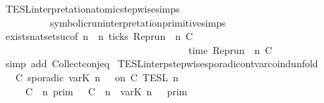 \begin{isabellebody}
\isanewline
%
\isadelimproof
%
\endisadelimproof
%
\isatagproof
{}\isamarkupfalse%
\ TESL{\isacharunderscore}interpretation{\isacharunderscore}atomic{\isacharunderscore}stepwise{\isachardot}simps{\isacharparenleft}{}{\isacharparenright}\isanewline
\ \ \ \ \ \ \ \ \ \ symbolic{\isacharunderscore}run{\isacharunderscore}interpretation{\isacharunderscore}primitive{\isachardot}simps{\isacharparenleft}{}{\isacharcomma}{}{\isacharparenright}\isanewline
{}\isamarkupfalse%
\ exists{\isacharunderscore}nat{\isacharunderscore}set{\isacharunderscore}suc{\isacharbrackleft}of\ {\isacartoucheopen}n{\isacartoucheclose}\ {\isacartoucheopen}{\isasymlambda}{\isasymrho}\ n{\isachardot}\ ticks\ {\isacharparenleft}Rep{\isacharunderscore}run\ {\isasymrho}\ n\ C\isanewline
\ \ \ \ \ \ \ \ \ \ \ \ \ \ \ \ \ \ \ \ \ \ \ \ \ \ \ \ \ \ \ \ \ \ \ \ \ {\isasymand}\ time\ {\isacharparenleft}Rep{\isacharunderscore}run\ {\isasymrho}\ n\ C\ {\isacharequal}\ {\isasymtau}{\isacartoucheclose}{\isacharbrackright}\isanewline
{}\isamarkupfalse%
\ {\isacharparenleft}simp\ add{\isacharcolon}\ Collect{\isacharunderscore}conj{\isacharunderscore}eq{\isacharparenright}%
\endisatagproof
{\isafoldproof}%
%
\isadelimproof
\isanewline
%
\endisadelimproof
\isanewline
{}\isamarkupfalse%
\ TESL{\isacharunderscore}interp{\isacharunderscore}stepwise{\isacharunderscore}sporadicon{\isacharunderscore}tvar{\isacharunderscore}coind{\isacharunderscore}unfold{\isacharcolon}\isanewline
\ \ {\isacartoucheopen}{\isasymlbrakk}\ C\ sporadic{\isasymsharp}\ {\isasymlparr}{\isasymtau}\isactrlsub v\isactrlsub a\isactrlsub r{\isacharparenleft}K{\isacharcomma}\ n{\isacharprime}{\isacharparenright}\ {\isasymoplus}\ {\isasymtau}{\isasymrparr}\ on\ C\ {\isasymrbrakk}\isactrlsub T\isactrlsub E\isactrlsub S\isactrlsub L\isactrlbsup {\isasymge}\ n\isactrlesup \ {\isacharequal}\isanewline
\ \ \ \ {\isasymlbrakk}\ C\ {\isasymUp}\ n\ {\isasymrbrakk}\isactrlsub p\isactrlsub r\isactrlsub i\isactrlsub m\ {\isasyminter}\ {\isasymlbrakk}\ C\ {\isasymDown}\ n\ {\isacharat}{\isasymsharp}\ {\isasymlparr}{\isasymtau}\isactrlsub v\isactrlsub a\isactrlsub r{\isacharparenleft}K{\isacharcomma}\ n{\isacharprime}{\isacharparenright}\ {\isasymoplus}\ {\isasymtau}{\isasymrparr}\ {\isasymrbrakk}\isactrlsub p\isactrlsub r\isactrlsub i\isactrlsub m\isanewline

\end{isabellebody}
